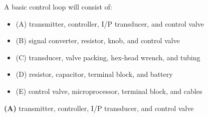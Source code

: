 

A basic control loop will consist of:

\begin{itemize}
\item{(A)} transmitter, controller, I/P transducer, and control valve
\vskip 5pt 
\item{(B)} signal converter, resistor, knob, and control valve
\vskip 5pt 
\item{(C)} transducer, valve packing, hex-head wrench, and tubing
\vskip 5pt 
\item{(D)} resistor, capacitor, terminal block, and battery
\vskip 5pt 
\item{(E)} control valve, microprocessor, terminal block, and cables
\end{itemize}







{\bf (A)} transmitter, controller, I/P transducer, and control valve
 









